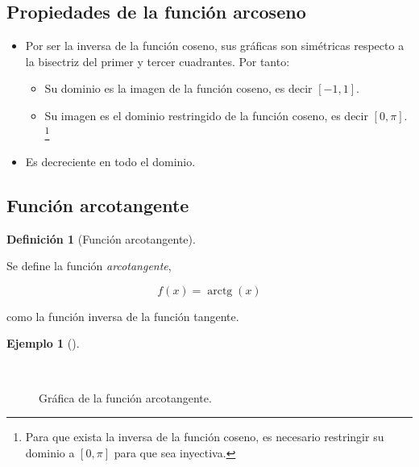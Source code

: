 \documentclass[
  a4paper,
]{scrreport}
\providecommand{\tightlist}{%
  \setlength{\itemsep}{0pt}\setlength{\parskip}{0pt}}\usepackage{longtable,booktabs,array}
\theoremstyle{plain}
\theoremstyle{plain}
\theoremstyle{definition}
\newtheorem{definition}{Definición}[chapter]
\theoremstyle{plain}
\theoremstyle{definition}
\newtheorem{example}{Ejemplo}[chapter]
\theoremstyle{remark}
\begin{document}
\hypertarget{propiedades-de-la-funciuxf3n-arcoseno-1}{%
\subsection{Propiedades de la función
arcoseno}\label{propiedades-de-la-funciuxf3n-arcoseno-1}}

\begin{itemize}
\tightlist
\item
  Por ser la inversa de la función coseno, sus gráficas son simétricas
  respecto a la bisectriz del primer y tercer cuadrantes. Por tanto:

  \begin{itemize}
  \tightlist
  \item
    Su dominio es la imagen de la función coseno, es decir \([-1,1]\).
  \item
    Su imagen es el dominio restringido de la función coseno, es decir
    \([0,\pi]\). \footnote{Para que exista la inversa de la función
      coseno, es necesario restringir su dominio a \([0,\pi]\) para que
      sea inyectiva.}
  \end{itemize}
\item
  Es decreciente en todo el dominio.
\end{itemize}

\hypertarget{funciuxf3n-arcotangente}{%
\subsection{Función arcotangente}\label{funciuxf3n-arcotangente}}

\leavevmode{}%
\begin{definition}[Función arcotangente]\label{def-funcion-arcotangente}

Se define la función \emph{arcotangente},

\[f(x)=\operatorname{arctg}(x)\]

como la función inversa de la función tangente.

\end{definition}

\leavevmode{}%
\begin{example}[]\label{exm-funcion-arcotangente}

~

\begin{figure}

{\centering 



}

\caption{Gráfica de la función arcotangente.}

\end{figure}

\end{example}
\end{document}
